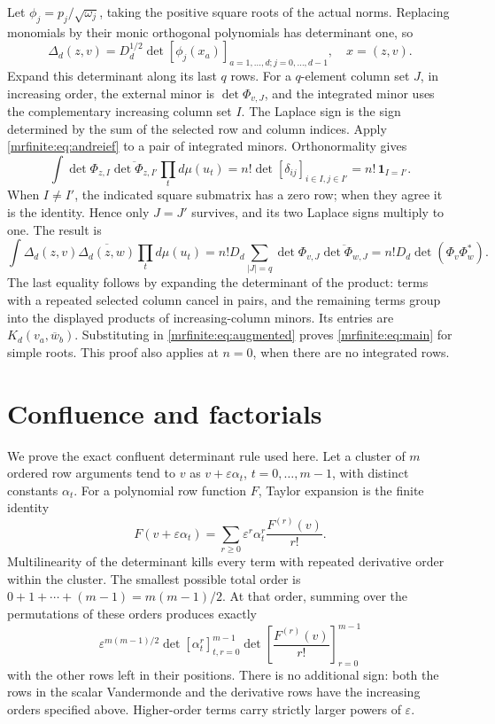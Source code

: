 \documentclass[11pt]{article}
\begin{document}
Let \(\phi_j=p_j/\sqrt{\omega_j}\), taking the positive square roots of
the actual norms. Replacing monomials by their monic orthogonal
polynomials has determinant one, so
\[
 \Delta_d(z,v)=D_d^{1/2}\det[\phi_j(x_a)]_{a=1,\ldots,d; j=0,\ldots,d-1},
 \quad x=(z,v).
\]
Expand this determinant along its last \(q\) rows. For a \(q\)-element
column set \(J\), in increasing order, the external minor is
\(\det\Phi_{v,J}\), and the integrated minor uses the complementary
increasing column set \(I\). The Laplace sign is the sign determined by
the sum of the selected row and column indices. Apply
\eqref{mrfinite:eq:andreief} to a pair of integrated minors. Orthonormality gives
\[
 \int\det\Phi_{z,I}\overline{\det\Phi_{z,I'}}\prod_t d\mu(u_t)
   =n!\det[\delta_{ij}]_{i\in I,j\in I'}
   =n!\,\mathbf1_{I=I'}.
\]
When \(I\ne I'\), the indicated square submatrix has a zero row;
when they agree it is the identity. Hence only \(J=J'\) survives, and
its two Laplace signs multiply to one. The result is
\[
 \int\Delta_d(z,v)\overline{\Delta_d(z,w)}\prod_t d\mu(u_t)
  =n!D_d\sum_{|J|=q}\det\Phi_{v,J}\overline{\det\Phi_{w,J}}
  =n!D_d\det(\Phi_v\Phi_w^*).
\]
The last equality follows by expanding the determinant of the product:
terms with a repeated selected column cancel in pairs, and the remaining
terms group into the displayed products of increasing-column minors.
Its entries are \(K_d(v_a,\overline w_b)\). Substituting in
\eqref{mrfinite:eq:augmented} proves \eqref{mrfinite:eq:main} for simple roots. This proof
also applies at \(n=0\), when there are no integrated rows.

\section{Confluence and factorials}\label{mrfinite:sec:confluence}

We prove the exact confluent determinant rule used here. Let a cluster
of \(m\) ordered row arguments tend to \(v\) as
\(v+\varepsilon\alpha_t\), \(t=0,\ldots,m-1\), with distinct constants
\(\alpha_t\). For a polynomial row function \(F\), Taylor expansion is
the finite identity
\[
 F(v+\varepsilon\alpha_t)
  =\sum_{r\geq0}\varepsilon^r\alpha_t^r\frac{F^{(r)}(v)}{r!}.
\]
Multilinearity of the determinant kills every term with repeated
derivative order within the cluster. The smallest possible total order
is \(0+1+\cdots+(m-1)=m(m-1)/2\). At that order, summing over the
permutations of these orders produces exactly
\[
 \varepsilon^{m(m-1)/2}
  \det[\alpha_t^r]_{t,r=0}^{m-1}
  \det\left[\frac{F^{(r)}(v)}{r!}\right]_{r=0}^{m-1}
\]
with the other rows left in their positions. There is no additional
sign: both the rows in the scalar Vandermonde and the derivative rows
have the increasing orders specified above. Higher-order terms carry
strictly larger powers of \(\varepsilon\).
\end{document}
